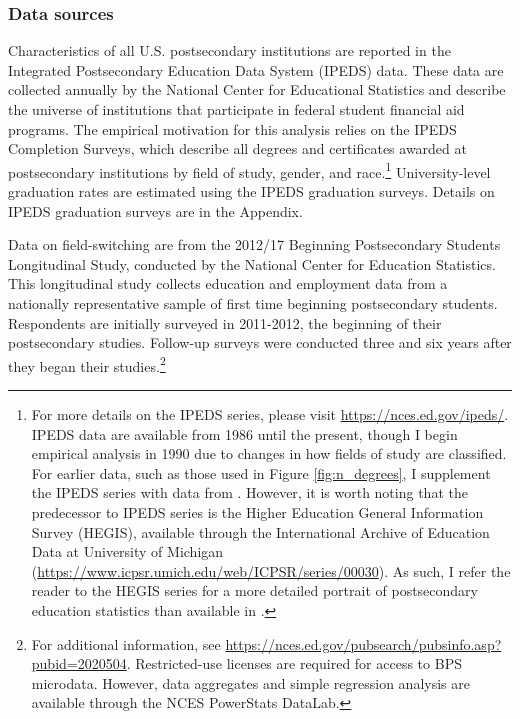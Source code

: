 \documentclass[11 pt]{article}
\begin{document}
\subsubsection*{Data sources}

Characteristics of all U.S. postsecondary institutions are reported in the Integrated Postsecondary Education Data System (IPEDS) data.
These data are collected annually by the National Center for Educational Statistics and describe the universe of institutions that participate in federal student financial aid programs. 
The empirical motivation for this analysis relies on the IPEDS Completion Surveys, which describe all degrees and certificates awarded at postsecondary institutions by field of study, gender, and race.\footnote{
    For more details on the IPEDS series, please visit \url{https://nces.ed.gov/ipeds/}.
    IPEDS data are available from 1986 until the present, though I begin empirical analysis in 1990 due to changes in how fields of study are classified.
    For earlier data, such as those used in Figure \ref{fig:n_degrees}, I supplement the IPEDS series with data from \textcite{S93}.
    However, it is worth noting that the predecessor to IPEDS series is the Higher Education General Information Survey (HEGIS), available through the International Archive of Education Data at University of Michigan (\url{https://www.icpsr.umich.edu/web/ICPSR/series/00030}). As such, I refer the reader to the HEGIS series for a more detailed portrait of postsecondary education statistics than available in \textcite{S93}.
}
University-level graduation rates are estimated using the IPEDS graduation surveys. 
Details on IPEDS graduation surveys are in the Appendix. 

Data on field-switching are from the 2012/17 Beginning Postsecondary Students Longitudinal Study, conducted by the National Center for Education Statistics. 
This longitudinal study collects education and employment data from a nationally representative sample of first time beginning postsecondary students.
Respondents are initially surveyed in 2011-2012, the beginning of their postsecondary studies. 
Follow-up surveys were conducted three and six years after they began their studies.\footnote{
    For additional information, see \url{https://nces.ed.gov/pubsearch/pubsinfo.asp?pubid=2020504}.
    Restricted-use licenses are required for access to BPS microdata. 
    However, data aggregates and simple regression analysis are available through the NCES PowerStats DataLab. 
}
\end{document}
